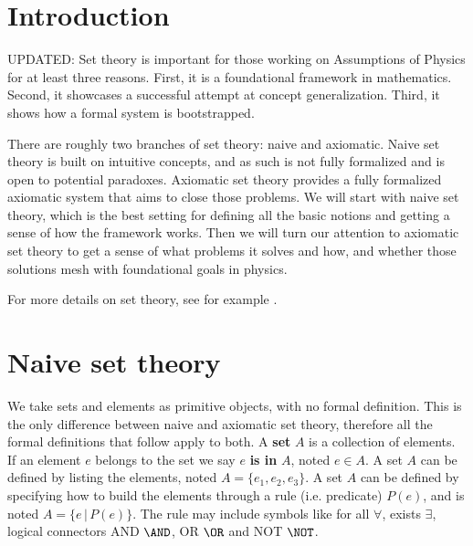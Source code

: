 \documentclass{bareminimum}
\begin{document}
\maketitle

\section{Introduction}

UPDATED: Set theory is important for those working on Assumptions of Physics for at least three reasons. First, it is a foundational framework in mathematics. Second, it showcases a successful attempt at concept generalization. Third, it shows how a formal system is bootstrapped.

There are roughly two branches of set theory: naive and axiomatic. Naive set theory is built on intuitive concepts, and as such is not fully formalized and is open to potential paradoxes. Axiomatic set theory provides a fully formalized axiomatic system that aims to close those problems. We will start with naive set theory, which is the best setting for defining all the basic notions and getting a sense of how the framework works. Then we will turn our attention to axiomatic set theory to get a sense of what problems it solves and how, and whether those solutions mesh with foundational goals in physics.

For more details on set theory, see for example \cite{pinter2014book}.

\section{Naive set theory}

We take sets and elements as primitive objects, with no formal definition. This is the only difference between naive and axiomatic set theory, therefore all the formal definitions that follow apply to both. A \textbf{set} $A$ is a collection of elements. If an element $e$ belongs to the set we say $e$ \textbf{is in} $A$, noted $ e 
\in A$. A set $A$ can be defined by listing the elements, noted $A = \{ e_1, e_2, e_3 \}$. A set $A$ can be defined by specifying how to build the elements through a rule (i.e. predicate) $P(e)$, and is noted $A = \{e \, | \,  P(e) \}$. The rule may include symbols like for all $\forall$, exists $\exists$, logical connectors AND $\AND$, OR $\OR$ and NOT $\NOT$.
\end{document}
